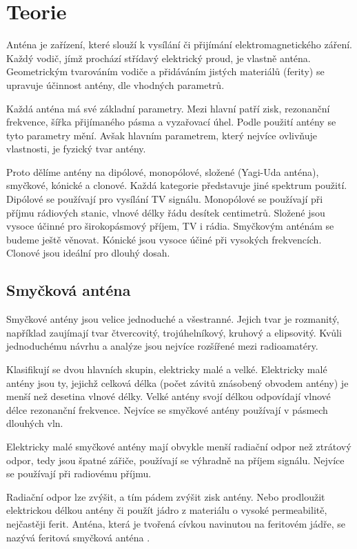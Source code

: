 \section{Teorie}

Anténa je zařízení, které slouží k vysílání či přijímání elektromagnetického záření.
Každý vodič, jímž prochází střídavý elektrický proud, je vlastně anténa. Geometrickým
tvarováním vodiče a přidáváním jistých materiálů (ferity) se upravuje účinnost antény, dle
vhodných parametrů.

Každá anténa má své základní parametry. Mezi hlavní patří zisk, rezonanční frekvence,
šířka přijímaného pásma a vyzařovací úhel. Podle použití antény se tyto parametry mění.
Avšak hlavním parametrem, který nejvíce ovlivňuje vlastnosti, je fyzický tvar antény.

Proto dělíme antény na dipólové, monopólové, složené (Yagi-Uda anténa), smyčkové, kónické
a clonové. Každá kategorie představuje jiné spektrum použití. Dipólové
se používají pro vysílání TV signálu. Monopólové se používají při
příjmu rádiových stanic, vlnové délky řádu desítek centimetrů. Složené jsou vysoce účinné
pro širokopásmový příjem, TV i rádia. Smyčkovým anténám se budeme ještě věnovat. Kónické
jsou vysoce účiné při vysokých frekvencích. Clonové jsou ideální pro dlouhý dosah.

\subsection{Smyčková anténa}

Smyčkové antény jsou velice jednoduché a všestranné. Jejich tvar je rozmanitý, například
zaujímají tvar čtvercovitý, trojúhelníkový, kruhový a elipsovitý. Kvůli jednoduchému
návrhu a analýze jsou nejvíce rozšířené mezi radioamatéry.

Klasifikují se dvou hlavních skupin, elektricky malé a velké. Elektricky malé antény jsou
ty, jejichž celková délka (počet závitů znásobený obvodem antény) je menší než desetina
vlnové délky. Velké antény svojí délkou odpovídají vlnové délce rezonanční
frekvence. Nejvíce se smyčkové antény používají v pásmech dlouhých vln.

Elektricky malé smyčkové antény mají obvykle menší radiační odpor než ztrátový odpor, tedy
jsou špatné zářiče, používají se výhradně na příjem signálu. Nejvíce se používají při
radiovému příjmu.

Radiační odpor lze zvýšit, a tím pádem zvýšit zisk antény. Nebo prodloužit elektrickou
délkou antény či
použít jádro z materiálu o vysoké permeabilitě, nejčastěji ferit. Anténa, která je tvořená
cívkou navinutou na feritovém jádře, se nazývá feritová smyčková anténa \cite{book04}.

